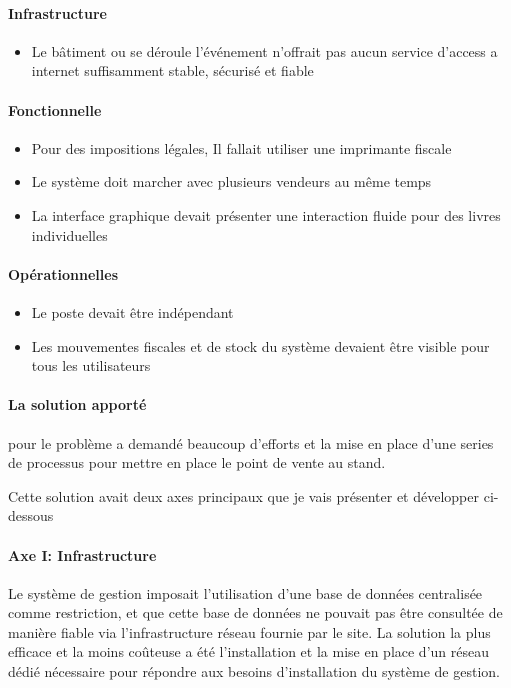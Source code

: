 \documentclass{resume} %
\begin{document}
		\paragraph{Infrastructure}
		\begin {itemize} 
			\item Le bâtiment ou se déroule l'événement n'offrait pas aucun service d'access a internet suffisamment stable, sécurisé et fiable
		\end {itemize}
		\paragraph{Fonctionnelle}
		\begin {itemize} 
			\item Pour des impositions légales, Il fallait utiliser une imprimante fiscale 
			\item Le système doit marcher avec plusieurs vendeurs au même temps
			\item La interface graphique devait présenter une interaction fluide pour des livres individuelles 
		\end {itemize}
		\paragraph{Opérationnelles}
		\begin {itemize} 
			\item Le poste devait être indépendant 
			\item Les mouvementes fiscales et de stock du système devaient être visible pour tous les utilisateurs
		\end {itemize}		
		
		
		
	   \paragraph{La solution apporté} pour le problème a demandé beaucoup d'efforts et la mise en place d'une series de  processus  pour mettre en place le point de vente au stand.
	   
	       Cette solution avait deux axes principaux que je vais présenter et développer ci-dessous
	   
	  	        
		\paragraph{Axe I: Infrastructure}
			Le système de gestion imposait l'utilisation d'une base de données centralisée comme restriction, et que cette base de données ne pouvait pas être consultée de manière fiable via l'infrastructure réseau fournie par le site.
La solution la plus efficace et la moins coûteuse a été  l'installation et la mise en place d'un réseau dédié nécessaire pour répondre aux besoins d'installation du système de gestion.
\end{document}
